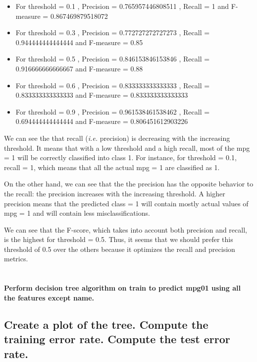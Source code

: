 \documentclass[
  12pt,
  oneside]{report}
\providecommand{\tightlist}{%
  \setlength{\itemsep}{0pt}\setlength{\parskip}{0pt}}
\begin{document}
\begin{itemize}
\tightlist
\item
  For threshold = 0.1 , Precision = 0.765957446808511 , Recall = 1 and F-measure = 0.867469879518072
\item
  For threshold = 0.3 , Precision = 0.772727272727273 , Recall = 0.944444444444444 and F-measure = 0.85
\item
  For threshold = 0.5 , Precision = 0.846153846153846 , Recall = 0.916666666666667 and F-measure = 0.88
\item
  For threshold = 0.6 , Precision = 0.833333333333333 , Recall = 0.833333333333333 and F-measure = 0.833333333333333
\item
  For threshold = 0.9 , Precision = 0.961538461538462 , Recall = 0.694444444444444 and F-measure = 0.806451612903226
\end{itemize}

We can see the that recall (\emph{i.e.} precision) is decreasing with the increasing threshold. It means that with a low threshold and a high recall, most of the mpg = 1 will be correctly classified into class 1. For instance, for threshold = 0.1, recall = 1, which means that all the actual mpg = 1 are classified as 1.

On the other hand, we can see that the the precision has the opposite behavior to the recall: the precision increases with the increasing threshold. A higher precision means that the predicted class = 1 will contain mostly actual values of mpg = 1 and will contain less misclassifications.

We can see that the F-score, which takes into account both precision and recall, is the highest for threshold = 0.5. Thus, it seems that we should prefer this threshold of 0.5 over the others because it optimizes the recall and precision metrics.

\newpage

\hypertarget{section-7}{%
\section{}\label{section-7}}

\textbf{Perform decision tree algorithm on train to predict mpg01 using all the features except name.}

\hypertarget{create-a-plot-of-the-tree.-compute-the-training-error-rate.-compute-the-test-error-rate.}{%
\subsection{Create a plot of the tree. Compute the training error rate. Compute the test error rate.}\label{create-a-plot-of-the-tree.-compute-the-training-error-rate.-compute-the-test-error-rate.}}
\end{document}

